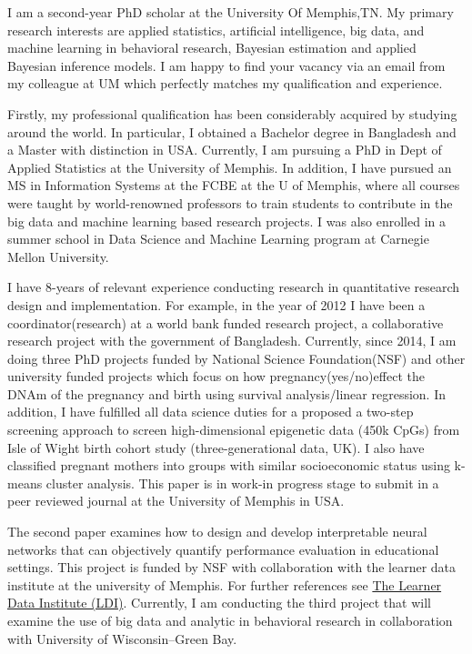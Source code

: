 \documentclass[11pt, a4paper]{awesome-cv}
\begin{document}
\makecvheader
\makelettertitle
\begin{cvletter}

I am a second-year PhD scholar at the University Of Memphis,TN. My primary research interests are applied statistics, artificial intelligence, big data, and machine learning in behavioral research, Bayesian estimation and applied Bayesian inference models. I am happy to find your vacancy via an email from my colleague at UM which perfectly matches my qualification and experience.



Firstly, my professional qualification has been considerably acquired by studying around the world. In particular, I obtained a Bachelor degree in Bangladesh and a Master with distinction in USA. Currently, I am pursuing a PhD in Dept of Applied Statistics at the University of Memphis. In addition, I have pursued an MS in Information Systems at the FCBE at the U of Memphis, where all courses were taught by world-renowned professors to train students to contribute in the big data and machine learning based research projects. I was also enrolled in a summer school in Data Science and Machine Learning program at Carnegie Mellon University.

I have 8-years of relevant experience conducting research in quantitative research design and implementation.  For example, in the year of 2012 I have been a coordinator(research) at a world bank funded research project, a collaborative research project with the government of Bangladesh. Currently, since 2014, I am doing three PhD projects funded by National Science Foundation(NSF) and other university funded projects which focus on how pregnancy(yes/no)effect the DNAm of the pregnancy and birth using survival analysis/linear regression. In addition, I have fulfilled all data science duties for a proposed a two-step screening approach to screen high-dimensional epigenetic data (450k CpGs) from Isle of Wight birth cohort study (three-generational data, UK). I also have classified pregnant mothers into groups with similar socioeconomic status using k-means cluster analysis. This paper is in work-in progress stage to submit in a peer reviewed journal at the University of Memphis in USA. 


  The second paper examines  how to design and develop interpretable neural networks that can objectively quantify performance evaluation in educational settings. This project is funded by NSF with collaboration with the learner data institute at the university of Memphis. For further references see \href{https://sites.google.com/view/learnerdatainstitute/overview?authuser=0}{The Learner Data Institute (LDI)}.  Currently, I am conducting the third project that will examine the use of big data and analytic in behavioral research in collaboration with University of Wisconsin–Green Bay. 



\end{cvletter}
\end{document}
